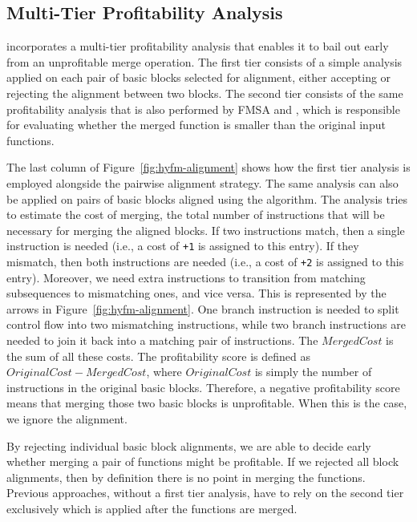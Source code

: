\subsection{Multi-Tier Profitability Analysis}
\label{sec:multi-profitability}

{\ProjName} incorporates a multi-tier profitability analysis that enables it to bail out early from an unprofitable merge operation.
The first tier consists of a simple analysis applied on each pair of basic blocks selected for alignment, either accepting or rejecting the alignment between two blocks. 
The second tier consists of the same profitability analysis that is also performed by FMSA and {\SOAName}, which is responsible for evaluating whether the merged function is smaller than the original input functions.

The last column of Figure~\ref{fig:hyfm-alignment} shows how the first tier analysis is employed alongside the pairwise alignment strategy.
The same analysis can also be applied on pairs of basic blocks aligned using the \NW algorithm.
The analysis tries to estimate the cost of merging, the total number of instructions that will be necessary for merging the aligned blocks.
If two instructions match, then a single instruction is needed (i.e., a cost of \texttt{+1} is assigned to this entry).
If they mismatch, then both instructions are needed (i.e., a cost of \texttt{+2} is assigned to this entry).
Moreover, we need extra instructions to transition from matching subsequences to mismatching ones, and vice versa.
This is represented by the arrows in Figure~\ref{fig:hyfm-alignment}.
One branch instruction is needed to split control flow into two mismatching instructions, while two branch instructions are needed to join it back into a matching pair of instructions. 
The $MergedCost$ is the sum of all these costs.
The profitability score is defined as $OriginalCost - MergedCost$, where $OriginalCost$ is simply the number of instructions in the original basic blocks.
Therefore, a negative profitability score means that merging those two basic blocks is unprofitable. When this is the case, we ignore the alignment.

By rejecting individual basic block alignments, we are able to decide early whether merging a pair of functions might be profitable. If we rejected all block alignments, then by definition there is no point in merging the functions. Previous approaches, without a first tier analysis, have to rely on the second tier exclusively which is applied after the functions are merged.


